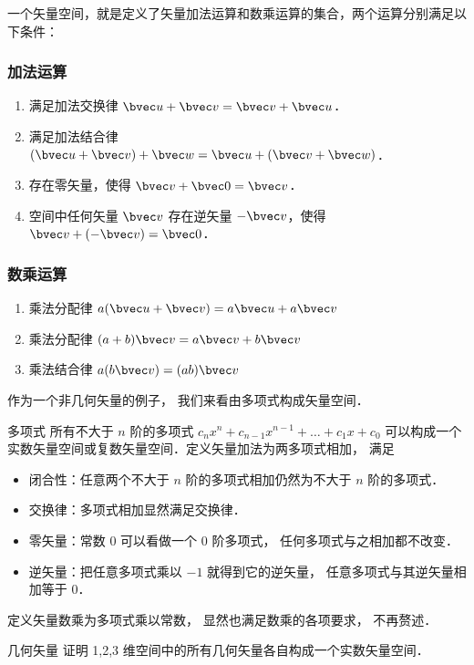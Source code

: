一个矢量空间，就是定义了矢量加法运算和数乘运算的集合，两个运算分别满足以下条件：

\subsubsection{加法运算}
\begin{enumerate}
\item 满足加法交换律 $\bvec u + \bvec v = \bvec v + \bvec u$．
\item 满足加法结合律 $(\bvec u + \bvec v) + \bvec w = \bvec u + (\bvec v + \bvec w)$．
\item 存在零矢量，使得 $\bvec v + \bvec 0 = \bvec v$．
\item 空间中任何矢量 $\bvec v$ 存在逆矢量 $-\bvec v$，使得 $\bvec v + (-\bvec v) = \bvec 0$．
\end{enumerate}

\subsubsection{数乘运算}
\begin{enumerate}
\item 乘法分配律 $a(\bvec u + \bvec v) = a\bvec u + a\bvec v$ 
\item 乘法分配律 $(a + b)\bvec v = a\bvec v + b\bvec v$
\item 乘法结合律 $a (b \bvec v) = (ab) \bvec v$
\end{enumerate}

作为一个非几何矢量的例子， 我们来看由多项式构成矢量空间．

\begin{example}{多项式}\label{LSpace_ex1}
所有不大于 $n$ 阶的多项式 $c_n x^n + c_{n-1} x^{n-1} + \dots + c_1 x + c_0$ 可以构成一个实数矢量空间或复数矢量空间．定义矢量加法为两多项式相加， 满足
\begin{itemize}
\item 闭合性：任意两个不大于 $n$ 阶的多项式相加仍然为不大于 $n$ 阶的多项式．
\item 交换律：多项式相加显然满足交换律．
\item 零矢量：常数 0 可以看做一个 0 阶多项式， 任何多项式与之相加都不改变．
\item 逆矢量：把任意多项式乘以 $-1$ 就得到它的逆矢量， 任意多项式与其逆矢量相加等于 0．
\end{itemize}
定义矢量数乘为多项式乘以常数， 显然也满足数乘的各项要求， 不再赘述．
\end{example}

\begin{exercise}{几何矢量}
证明 1,2,3 维空间中的所有几何矢量各自构成一个实数矢量空间．
\end{exercise}

